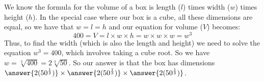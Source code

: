 \documentclass{ximera}
\begin{document}
        \begin{example}%
            We know the formula for the volume of a box is length ($l$) times width ($w$) times height ($h$). In the special case where our box is a cube, all these dimensions are equal, so we have that $w = l = h$ and our equation for volume ($V$) becomes:
            \[
                400 = V = l \times w \times h = w \times w \times w = w^3
            \]
            Thus, to find the width (which is also the length and height) we need to solve the equation $w^3 = 400$, which involves taking a cube root. So we have $w = \sqrt[3]{400} = 2\sqrt[3]{50}$. So our answer is that the box has dimensions $\answer{2(50^{\frac{1}{3}})} \times \answer{2(50^{\frac{1}{3}})} \times \answer{2(50^{\frac{1}{3}})}$.
        \end{example}%
            
%            
%
%
%
%
\end{document}

